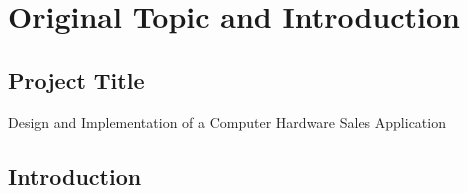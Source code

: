\documentclass[12pt,a4paper]{report}
\begin{document}
\part{Original Topic and Introduction}
\chapter*{Project Title}
Design and Implementation of a Computer Hardware Sales Application

\chapter*{Introduction}
\end{document}
